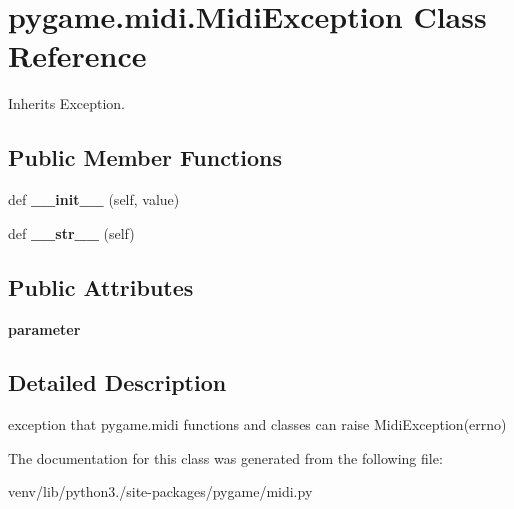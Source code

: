 \hypertarget{classpygame_1_1midi_1_1_midi_exception}{}\section{pygame.\+midi.\+Midi\+Exception Class Reference}
\label{classpygame_1_1midi_1_1_midi_exception}


Inherits Exception.

\subsection*{Public Member Functions}
\begin{DoxyCompactItemize}
\item 
\mbox{\label{classpygame_1_1midi_1_1_midi_exception_a38cc346d097dfb3208725f33e7ff4c30}} 
def {\bfseries \+\_\+\+\_\+init\+\_\+\+\_\+} (self, value)
\item 
\mbox{\label{classpygame_1_1midi_1_1_midi_exception_abc2ddd5192f44196e8cdfd5101016d39}} 
def {\bfseries \+\_\+\+\_\+str\+\_\+\+\_\+} (self)
\end{DoxyCompactItemize}
\subsection*{Public Attributes}
\begin{DoxyCompactItemize}
\item 
\mbox{\label{classpygame_1_1midi_1_1_midi_exception_aada4d4b6254be7894968a77533136557}} 
{\bfseries parameter}
\end{DoxyCompactItemize}


\subsection{Detailed Description}
\begin{DoxyVerb}exception that pygame.midi functions and classes can raise
MidiException(errno)
\end{DoxyVerb}
 

The documentation for this class was generated from the following file\+:\begin{DoxyCompactItemize}
\item 
venv/lib/python3./site-\/packages/pygame/midi.\+py\end{DoxyCompactItemize}
